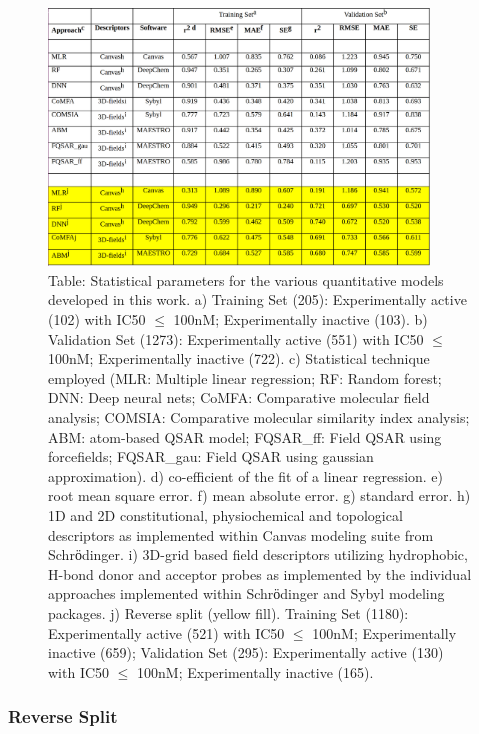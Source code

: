 \begin{figure}
  \centering
  \includegraphics[width=0.9\textwidth]{Images/bace_table_2.png}
  \caption{Table: Statistical parameters for the various quantitative models developed in this work. a) Training Set (205):  Experimentally active (102) with IC50 $\leq$ 100nM; Experimentally inactive (103). b) Validation Set (1273):  Experimentally active (551) with IC50 $\leq$  100nM; Experimentally inactive (722). c) Statistical technique employed (MLR:  Multiple linear regression; RF:  Random forest; DNN: Deep neural nets; CoMFA:  Comparative molecular field analysis; COMSIA:  Comparative molecular similarity index analysis; ABM:  atom-based QSAR model; FQSAR\_ff:  Field QSAR using forcefields; FQSAR\_gau:  Field QSAR using gaussian approximation). d) co-efficient of the fit of a linear regression. e) root mean square error. f) mean absolute error. g) standard error. h) 1D and 2D constitutional, physiochemical and topological descriptors as implemented within Canvas modeling suite from Schrӧdinger. i) 3D-grid based field descriptors utilizing hydrophobic, H-bond donor and acceptor probes as implemented by the individual approaches implemented within Schrӧdinger and Sybyl modeling packages. j) Reverse split (yellow fill).  Training Set (1180):  Experimentally active (521) with IC50 $\leq$ 100nM; Experimentally inactive (659); Validation Set (295):  Experimentally active (130) with IC50 $\leq$ 100nM; Experimentally inactive (165).}
  \label{fig:bace_table2}
\end{figure}

\subsubsection{Reverse Split}

